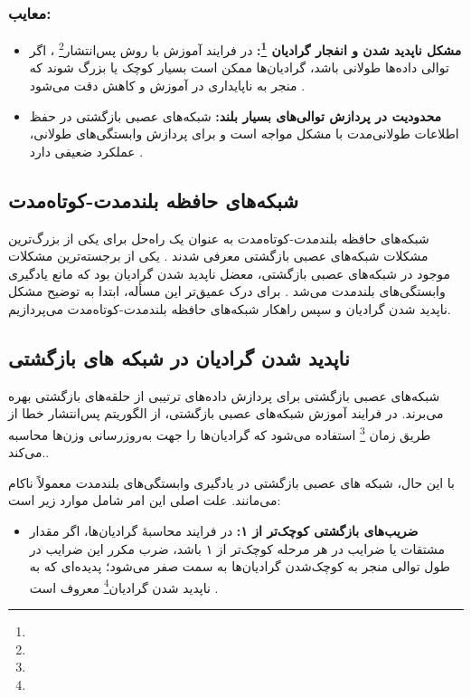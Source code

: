\subsubsection{معایب:}
\begin{itemize}
\item \textbf{مشکل ناپدید شدن و انفجار گرادیان \footnote{}:}
در فرایند آموزش با روش پس‌انتشار\footnote{} ، اگر توالی داده‌ها طولانی باشد، گرادیان‌ها ممکن است بسیار کوچک یا بزرگ شوند که منجر به ناپایداری در آموزش و کاهش دقت می‌شود
	\cite{hochreiter1998vanishing}.
	
	\item \textbf{محدودیت در پردازش توالی‌های بسیار بلند:}  
 شبکه‌های عصبی بازگشتی در حفظ اطلاعات طولانی‌مدت با مشکل مواجه است و برای پردازش وابستگی‌های طولانی، عملکرد ضعیفی دارد
	\cite{hochreiter1997long,goodfellow2016deep}.
\end{itemize}

\subsection{شبکه‌های حافظه بلندمدت-کوتاه‌مدت}

شبکه‌های حافظه بلندمدت-کوتاه‌مدت به عنوان یک راه‌حل برای یکی از بزرگ‌ترین مشکلات شبکه‌های عصبی بازگشتی معرفی شدند
\cite{hochreiter1997long}.
یکی از برجسته‌ترین مشکلات موجود در شبکه‌های عصبی بازگشتی، معضل ناپدید شدن گرادیان  بود که مانع یادگیری وابستگی‌های بلندمدت می‌شد
\cite{hochreiter1998vanishing,goodfellow2016deep}.
برای درک عمیق‌تر این مسأله، ابتدا به توضیح مشکل ناپدید شدن گرادیان و سپس راهکار شبکه‌های حافظه بلندمدت-کوتاه‌مدت می‌پردازیم.

\subsection{ناپدید شدن گرادیان در شبکه های بازگشتی}
شبکه‌های عصبی بازگشتی برای پردازش داده‌های ترتیبی از حلقه‌های بازگشتی بهره می‌برند. در فرایند آموزش شبکه‌های عصبی بازگشتی، از الگوریتم پس‌انتشار خطا از طریق زمان \footnote{} استفاده می‌شود که گرادیان‌ها را جهت به‌روزرسانی وزن‌ها محاسبه می‌کند.\cite{rumelhart1986learning}.

با این حال، شبکه های عصبی بازگشتی در یادگیری وابستگی‌های بلندمدت معمولاً ناکام می‌مانند. علت اصلی این امر شامل موارد زیر است:

\begin{itemize}
	\item \textbf{ضریب‌های بازگشتی کوچک‌تر از ۱:}
	در فرایند محاسبهٔ گرادیان‌ها، اگر مقدار مشتقات یا ضرایب در هر مرحله کوچک‌تر از ۱ باشد، ضرب مکرر این ضرایب در طول توالی منجر به کوچک‌شدن گرادیان‌ها به سمت صفر می‌شود؛ پدیده‌ای که به ناپدید شدن گرادیان\footnote{} معروف است
	\cite{hochreiter1998vanishing}.
\end{itemize}


